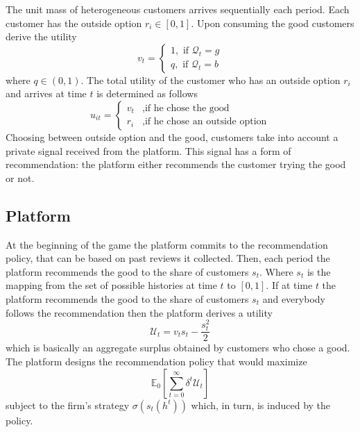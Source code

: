 \documentclass[a4paper]{article}
\newcommand{\expect}{\mathbb{E}}
\begin{document}
	
	The unit mass of heterogeneous customers arrives sequentially each period. Each customer has the outside option $r_i \in [0, 1]$. Upon consuming the good customers derive the utility $$v_t = \begin{cases}
	1, \text{ if }\mathcal{Q}_t = g\\
	q, \text{ if }\mathcal{Q}_t = b
	\end{cases}$$
	where $q \in (0, 1)$. The total utility of the customer who has an outside option $r_i$ and arrives at time $t$ is determined as follows $$u_{it} = \begin{cases}
	v_t &,\text{if he chose the good}\\
	r_{i} &,\text{if he chose an outside option}
	\end{cases}$$
	Choosing between outside option and the good, customers take into account a private signal received from the platform. This signal has a form of recommendation: the platform either recommends the customer trying the good or not. 
	\subsection{Platform}
	At the beginning of the game the platform commits to the recommendation policy, that can be based on past reviews it collected. Then, each period the platform recommends the good to the share of customers $s_t$. Where $s_t$ is the mapping from the set of possible histories at time $t$ to $[0, 1]$. If at time $t$ the platform recommends the good to the share of customers $s_t$ and everybody follows the recommendation then the platform derives a utility $$\mathcal{U}_t = v_ts_t - \frac{s_t^2}{2}$$ which is basically an aggregate surplus obtained by customers who chose a good. The platform designs the recommendation policy that would maximize $$\expect_0\left[\sum_{t=0}^{\infty} \delta^t \mathcal{U}_t\right]$$ subject to the firm's strategy $\sigma(s_t(h^t))$ which, in turn, is induced by the policy.
\end{document}
